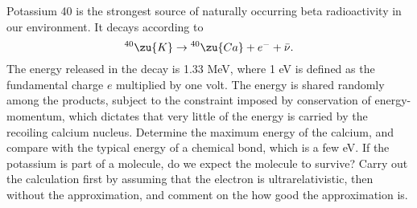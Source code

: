 Potassium 40 is the strongest source of naturally occurring beta radioactivity in our environment.
It decays according to
\begin{equation*}
  {}^{40}\zu{K} \rightarrow {}^{40}\zu{Ca} + e^- + \bar{\nu} .
\end{equation*}
The energy released in the decay is 1.33 MeV, where 1 eV is defined as the fundamental charge
$e$ multiplied by one volt. The energy is shared randomly among the products,
subject to the constraint imposed by conservation of energy-momentum, which dictates that very
little of the energy is carried by the recoiling calcium nucleus. Determine the maximum energy
of the calcium, and compare with the typical energy of a chemical bond, which is a few eV.
If the potassium is part of a molecule, do we expect the molecule to survive?
Carry out the calculation first by assuming that the electron is ultrarelativistic, then
without the approximation, and comment on the how good the approximation is.
